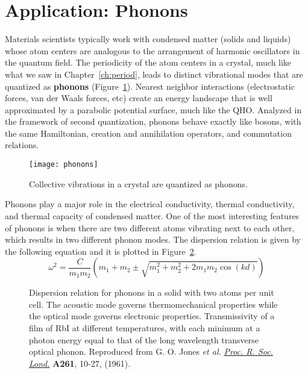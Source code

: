 \section{Application: Phonons}
Materials scientists typically work with condensed matter (solids and liquids) whose atom centers are analogous to the arrangement of harmonic oscillators in the quantum field. The periodicity of the atom centers in a crystal, much like what we saw in Chapter~\ref{ch:period}, leads to distinct vibrational modes that are quantized as \textbf{phonons} (Figure~\ref{fig:phonons}). Nearest neighbor interactions (electrostatic forces, van der Waals forces, etc) create an energy landscape that is well approximated by a parabolic potential surface, much like the QHO. Analyzed in the framework of second quantization, phonons behave exactly like bosons, with the same Hamiltonian, creation and annihilation operators, and commutation relations. 

\begin{figure}[!h]
	\centering
	\texttt{[image: phonons]}
	\caption{Collective vibrations in a crystal are quantized as phonons.}
	\label{fig:phonons}
\end{figure}

Phonons play a major role in the electrical conductivity, thermal conductivity, and thermal capacity of condensed matter. One of the most interesting features of phonons is when there are two different atoms vibrating next to each other, which results in two different phonon modes. The dispersion relation is given by the following equation and it is plotted in Figure~\ref{fig:phonon-modes}.
\begin{equation}
	\omega^2 = \frac{C}{m_1m_2} \left(m_1 + m_2 \pm \sqrt{m_1^2 + m_2^2 + 2m_1m_2\cos(kd)}\right)
\end{equation}

\begin{figure}[!h]
	\centering
	 \hspace{3ex}
	\caption{\protect{} Dispersion relation for phonons in a solid with two atoms per unit cell. The acoustic mode governs thermomechanical properties while the optical mode governs electronic properties. \protect{} Transmissivity of a film of RbI at different temperatures, with each minimum at a photon energy equal to that of the long wavelength transverse optical phonon. Reproduced from G. O. Jones \emph{et al.} \href{http://rspa.royalsocietypublishing.org/content/261/1304/10}{\emph{Proc. R. Soc. Lond.}} \textbf{A261}, 10-27, (1961).}
	\label{fig:phonon-modes}
\end{figure}

